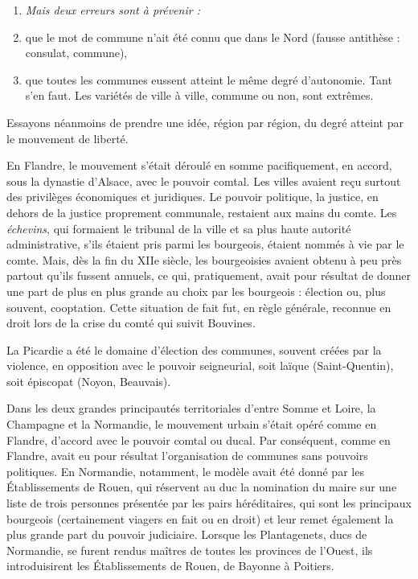 \documentclass[french,twoside]{book} %
\newlength{\listmod}
\newcommand{\listhead}[1]{\hspace{-1\listmod}\emph{#1}}
\begin{document}
\begin{enumerate}[itemsep=0pt,]
\item[]\listhead{Mais deux erreurs sont à prévenir :}
\item que le mot de commune n’ait été connu que dans le Nord (fausse antithèse : consulat, commune),
\item que toutes les communes eussent atteint le même degré d’autonomie. Tant s’en faut. Les variétés de ville à ville, commune ou non, sont extrêmes.

\end{enumerate}\noindent Essayons néanmoins de prendre une idée, région par région, du degré atteint par le mouvement de liberté.\par
En Flandre, le mouvement s’était déroulé en somme pacifiquement, en accord, sous la dynastie d’Alsace, avec le pouvoir comtal. Les villes avaient reçu surtout des privilèges économiques et juridiques. Le pouvoir politique, la justice, en dehors de la justice proprement communale, restaient aux mains du comte. Les \emph{échevins}, qui formaient le tribunal de la ville et sa plus haute autorité administrative, s’ils étaient pris parmi les bourgeois, étaient nommés à vie par le comte. Mais, dès la fin du XIIe siècle, les bourgeoisies avaient obtenu à peu près partout qu’ils fussent annuels, ce qui,  
\label{p73} pratiquement, avait pour résultat de donner une part de plus en plus grande au choix par les bourgeois : élection ou, plus souvent, cooptation. Cette situation de fait fut, en règle générale, reconnue en droit lors de la crise du comté qui suivit Bouvines.\par
La Picardie a été le domaine d’élection des communes, souvent créées par la violence, en opposition avec le pouvoir seigneurial, soit laïque (Saint-Quentin), soit épiscopat (Noyon, Beauvais).\par
Dans les deux grandes principautés territoriales d’entre Somme et Loire, la Champagne et la Normandie, le mouvement urbain s’était opéré comme en Flandre, d’accord avec le pouvoir comtal ou ducal. Par conséquent, comme en Flandre, avait eu pour résultat l’organisation de communes sans pouvoirs politiques. En Normandie, notamment, le modèle avait été donné par les Établissements de Rouen, qui réservent au duc la nomination du maire sur une liste de trois personnes présentée par les pairs héréditaires, qui sont les principaux bourgeois (certainement viagers en fait ou en droit) et leur remet également la plus grande part du pouvoir judiciaire. Lorsque les Plantagenets, ducs de Normandie, se furent rendus maîtres de toutes les provinces de l’Ouest, ils introduisirent les Établissements de Rouen, de Bayonne à Poitiers.\par
\end{document}
